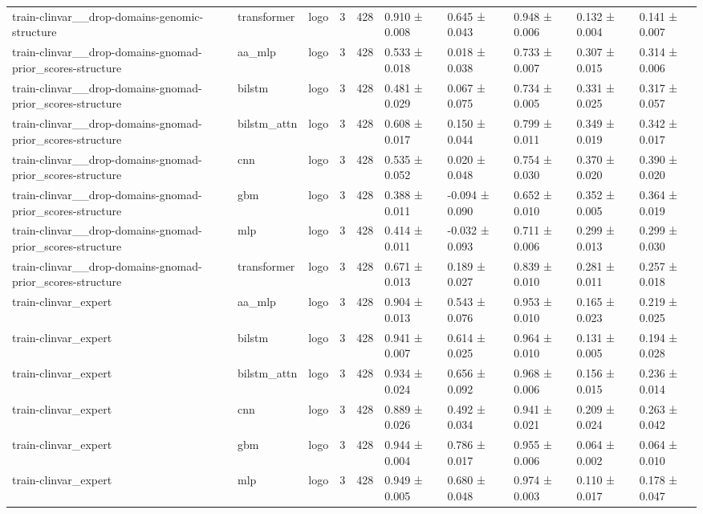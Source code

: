 \begin{table}[t]
\begin{tabular}{llllllllll}
train-clinvar\_\_drop-domains-genomic-structure & transformer & logo & 3 & 428 & 0.910 ± 0.008 & 0.645 ± 0.043 & 0.948 ± 0.006 & 0.132 ± 0.004 & 0.141 ± 0.007 \\
train-clinvar\_\_drop-domains-gnomad-prior\_scores-structure & aa\_mlp & logo & 3 & 428 & 0.533 ± 0.018 & 0.018 ± 0.038 & 0.733 ± 0.007 & 0.307 ± 0.015 & 0.314 ± 0.006 \\
train-clinvar\_\_drop-domains-gnomad-prior\_scores-structure & bilstm & logo & 3 & 428 & 0.481 ± 0.029 & 0.067 ± 0.075 & 0.734 ± 0.005 & 0.331 ± 0.025 & 0.317 ± 0.057 \\
train-clinvar\_\_drop-domains-gnomad-prior\_scores-structure & bilstm\_attn & logo & 3 & 428 & 0.608 ± 0.017 & 0.150 ± 0.044 & 0.799 ± 0.011 & 0.349 ± 0.019 & 0.342 ± 0.017 \\
train-clinvar\_\_drop-domains-gnomad-prior\_scores-structure & cnn & logo & 3 & 428 & 0.535 ± 0.052 & 0.020 ± 0.048 & 0.754 ± 0.030 & 0.370 ± 0.020 & 0.390 ± 0.020 \\
train-clinvar\_\_drop-domains-gnomad-prior\_scores-structure & gbm & logo & 3 & 428 & 0.388 ± 0.011 & -0.094 ± 0.090 & 0.652 ± 0.010 & 0.352 ± 0.005 & 0.364 ± 0.019 \\
train-clinvar\_\_drop-domains-gnomad-prior\_scores-structure & mlp & logo & 3 & 428 & 0.414 ± 0.011 & -0.032 ± 0.093 & 0.711 ± 0.006 & 0.299 ± 0.013 & 0.299 ± 0.030 \\
train-clinvar\_\_drop-domains-gnomad-prior\_scores-structure & transformer & logo & 3 & 428 & 0.671 ± 0.013 & 0.189 ± 0.027 & 0.839 ± 0.010 & 0.281 ± 0.011 & 0.257 ± 0.018 \\
train-clinvar\_expert & aa\_mlp & logo & 3 & 428 & 0.904 ± 0.013 & 0.543 ± 0.076 & 0.953 ± 0.010 & 0.165 ± 0.023 & 0.219 ± 0.025 \\
train-clinvar\_expert & bilstm & logo & 3 & 428 & 0.941 ± 0.007 & 0.614 ± 0.025 & 0.964 ± 0.010 & 0.131 ± 0.005 & 0.194 ± 0.028 \\
train-clinvar\_expert & bilstm\_attn & logo & 3 & 428 & 0.934 ± 0.024 & 0.656 ± 0.092 & 0.968 ± 0.006 & 0.156 ± 0.015 & 0.236 ± 0.014 \\
train-clinvar\_expert & cnn & logo & 3 & 428 & 0.889 ± 0.026 & 0.492 ± 0.034 & 0.941 ± 0.021 & 0.209 ± 0.024 & 0.263 ± 0.042 \\
train-clinvar\_expert & gbm & logo & 3 & 428 & 0.944 ± 0.004 & 0.786 ± 0.017 & 0.955 ± 0.006 & 0.064 ± 0.002 & 0.064 ± 0.010 \\
train-clinvar\_expert & mlp & logo & 3 & 428 & 0.949 ± 0.005 & 0.680 ± 0.048 & 0.974 ± 0.003 & 0.110 ± 0.017 & 0.178 ± 0.047 \\

\end{tabular}
\end{table}
